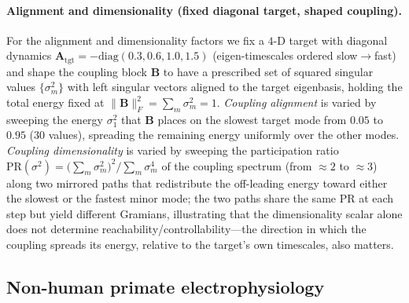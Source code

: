 \paragraph{Alignment and dimensionality (fixed diagonal target, shaped coupling).} For the alignment and dimensionality factors we fix a $4$-D target with diagonal dynamics $\mathbf{A}_{\mathrm{tgt}}=-\mathrm{diag}(0.3,0.6,1.0,1.5)$ (eigen-timescales ordered slow$\to$fast) and shape the coupling block $\mathbf{B}$ to have a prescribed set of squared singular values $\{\sigma_m^2\}$ with left singular vectors aligned to the target eigenbasis, holding the total energy fixed at $\|\mathbf{B}\|_{F}^{2}=\sum_m\sigma_m^2=1$. \emph{Coupling alignment} is varied by sweeping the energy $\sigma_1^2$ that $\mathbf{B}$ places on the slowest target mode from $0.05$ to $0.95$ ($30$ values), spreading the remaining energy uniformly over the other modes. \emph{Coupling dimensionality} is varied by sweeping the participation ratio $\mathrm{PR}(\sigma^2)=\bigl(\sum_m\sigma_m^2\bigr)^2/\sum_m\sigma_m^4$ of the coupling spectrum (from $\approx2$ to $\approx3$) along two mirrored paths that redistribute the off-leading energy toward either the slowest or the fastest minor mode; the two paths share the same $\mathrm{PR}$ at each step but yield different Gramians, illustrating that the dimensionality scalar alone does not determine reachability/controllability---the direction in which the coupling spreads its energy, relative to the target's own timescales, also matters.

\subsection{Non-human primate electrophysiology}\label{supp:interareal-control-nhp-ephys}

